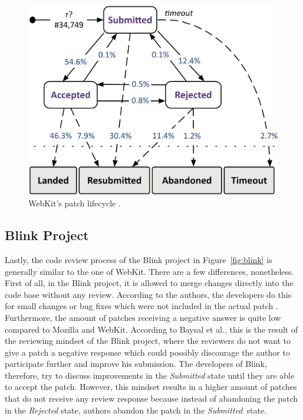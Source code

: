 \documentclass[conference]{IEEEtran}
\begin{document}
\begin{figure}
    \centering
    \includegraphics[scale=0.25]{img/webkit.png}
    \caption{WebKit's patch lifecycle \cite{baysal2015synthesizing}.}
    \label{fig:webkit}
\end{figure}

\subsection{Blink Project}

Lastly, the code review process of the Blink project in Figure~\ref{fig:blink} is generally similar to the one of WebKit. There are a few differences, nonetheless. First of all, in the Blink project, it is allowed to merge changes directly into the code base without any review. According to the authors, the developers do this for small changes or bug fixes which were not included in the actual patch \cite{baysal2015synthesizing}. Furthermore, the amount of patches receiving a negative answer is quite low compared to Mozilla and WebKit. According to Baysal et al.\cite{baysal2015synthesizing}, this is the result of the reviewing mindset of the Blink project, where the reviewers do not want to give a patch a negative response which could possibly discourage the author to participate further and improve his submission. The developers of Blink, therefore, try to discuss improvements in the \textit{Submitted} state until they are able to accept the patch. However, this mindset results in a higher amount of patches that do not receive any review response because instead of abandoning the patch in the \textit{Rejected} state, authors abandon the patch in the \textit{Submitted}~state.
\end{document}
